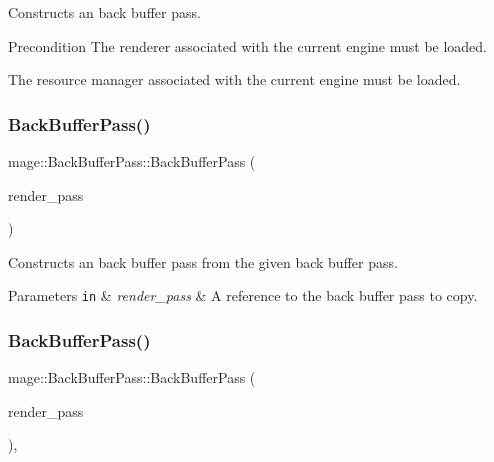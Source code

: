 Constructs an back buffer pass.

\begin{DoxyPrecond}{Precondition}
The renderer associated with the current engine must be loaded. 

The resource manager associated with the current engine must be loaded. 
\end{DoxyPrecond}
\hypertarget{classmage_1_1_back_buffer_pass_af69d8bb752a4e35d57ebd5afedaa097d}{}\label{classmage_1_1_back_buffer_pass_af69d8bb752a4e35d57ebd5afedaa097d} 
\subsubsection{\texorpdfstring{Back\+Buffer\+Pass()}{BackBufferPass()}\hspace{0.1cm}{\footnotesize\ttfamily [2/3]}}
{\footnotesize\ttfamily mage\+::\+Back\+Buffer\+Pass\+::\+Back\+Buffer\+Pass (\begin{DoxyParamCaption}\item[{const \hyperlink{classmage_1_1_back_buffer_pass}{Back\+Buffer\+Pass} \&}]{render\+\_\+pass }\end{DoxyParamCaption})\hspace{0.3cm}{\ttfamily [delete]}}

Constructs an back buffer pass from the given back buffer pass.


\begin{DoxyParams}[1]{Parameters}
\mbox{\tt in}  & {\em render\+\_\+pass} & A reference to the back buffer pass to copy. \\
\hline
\end{DoxyParams}
\hypertarget{classmage_1_1_back_buffer_pass_aaccba5ea4ae969dff8ee4f9c8f5ae1e2}{}\label{classmage_1_1_back_buffer_pass_aaccba5ea4ae969dff8ee4f9c8f5ae1e2} 
\subsubsection{\texorpdfstring{Back\+Buffer\+Pass()}{BackBufferPass()}\hspace{0.1cm}{\footnotesize\ttfamily [3/3]}}
{\footnotesize\ttfamily mage\+::\+Back\+Buffer\+Pass\+::\+Back\+Buffer\+Pass (\begin{DoxyParamCaption}\item[{\hyperlink{classmage_1_1_back_buffer_pass}{Back\+Buffer\+Pass} \&\&}]{render\+\_\+pass }\end{DoxyParamCaption})\hspace{0.3cm}{\ttfamily [default]}, {\ttfamily [noexcept]}}

